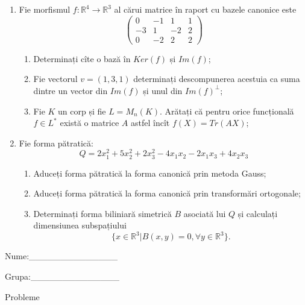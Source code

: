 \documentclass{article}
\begin{document}
\begin{enumerate}
 \item Fie morfismul $f:\mathbb{R}^4 \to \mathbb{R}^3$ al cărui matrice în raport cu bazele canonice este
$$\begin{pmatrix}
0&-1&1&1\\
-3&1&-2&2\\
0&-2&2&2
\end{pmatrix}$$

\begin{enumerate}
\item Determinați cîte o bază în $Ker(f)$ și $Im(f)$;
\item Fie vectorul $v=(1,3,1)$ determinați descompunerea acestuia ca suma dintre un vector din $Im(f)$ și unul din $Im(f)^\perp$;
\item Fie $K$ un corp și fie $L=M_n(K)$. Arătați că pentru orice funcțională $f \in L^*$ există o matrice $A$ astfel încît $f(X)=Tr(AX)$;
\end{enumerate}
\item Fie forma pătratică:
$$Q= 2x_1^2+5x_2^2+2x_3^2-4x_1x_2-2x_1x_3+4x_2x_3$$

\begin{enumerate}
\item Aduceți forma pătratică la forma canonică prin metoda Gauss;
\item Aduceți forma pătratică la forma canonică prin transformări ortogonale;
\item Determinați forma biliniară simetrică $B$ asociată lui $Q$ și calculați dimensiunea subspațiului
$$\{x \in \mathbb{R}^3 | B(x,y)=0,\forall y \in \mathbb{R}^3\}.$$

\end{enumerate}
\end{enumerate}
\newpage
\begin{flushright}
Nume:\_\_\_\_\_\_\_\_\_\_\_\_\_\_
 
 
Grupa:\_\_\_\_\_\_\_\_\_\_\_\_\_\_
\end{flushright}
\begin{center}
\vspace{2cm}
{\Large Probleme}
\vspace{2cm}
\end{center}
\end{document}
